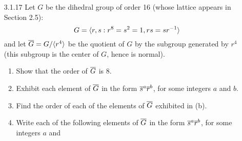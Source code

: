\begin{enumerate}
      \textbf{Proof.} We will only prove the general statement. If
      $S = \emptyset$, then the statement trivially holds, so suppose that
      $S = \{g_1, \ldots, g_n\}$, where $g_i \in G$, for $1 \le i \le n$. Now 
      suppose that $G = \cyc{S}$. We want to prove that $\m{G} = \cyc{\m{S}}$, 
      where $\m{S} = \{\m{g_1}, \ldots, \m{g_n}\} = \{g_1N, \ldots, g_nN\}$. Let 
      $X \in \m{G}$. Then $X = \m{g}$ for some $g \in G$. Since $G$ was
      generated by $S$, there exist $m$ elements of $S$ (not necessarily 
      distinct), $h_1$, $\ldots$, $h_m$ and integers $\epsilon_1$, $\ldots$,
      $\epsilon_m$ such that $g = {h_1}^{\epsilon_1} \ldots {h_m}^{\epsilon_m}$. 
      Thus 
      \begin{align*}
         \m{g} &= \m{{h_1}^{\epsilon_1} \ldots {h_m}^{\epsilon_m}} \\
               &= \m{{h_1}^{\epsilon_1}} \ldots \m{{h_m}^{\epsilon_m}}
                  &[\text{Proposition 5 (1)}] \\
               &= \m{h_1}^{\epsilon_1} \ldots \m{h_m}^{\epsilon_m}
                  \in \cyc{\m{S}},
                  &[\text{Exercise 4}]
      \end{align*}
      so that $\m{G} \subseteq \cyc{\m{S}}$. The reverse containment is evident
      because $\m{S} \subseteq \m{G}$. Thus $\m{G} = \cyc{\m{S}}$. \qed
   \item[3.1.17]  Let $G$ be the dihedral group of order 16 (whose lattice
                  appears in Section 2.5):
                  $$G = \langle r, s : r^8 = s^2 = 1, rs = sr^{-1} \rangle$$
                  and let $\overline{G} = G/\langle r^4 \rangle$ be the quotient of $G$ by
                  the subgroup generated by $r^4$ (this subgroup is the center
                  of $G$, hence is normal).
                  \begin{enumerate}
                     \item Show that the order of $\overline{G}$ is 8.
                     \item Exhibit each element of $\overline{G}$ in the form
                           $\overline{s}^a\overline{r}^b$, for some integers $a$ and $b$.
                     \item Find the order of each of the elements of
                           $\overline{G}$ exhibited in (b).
                     \item Write each of the following elements of $\overline{G}$ in
                           the form $\overline{s}^a\overline{r}^b$, for some integers $a$ and

\end{enumerate}
\end{enumerate}
